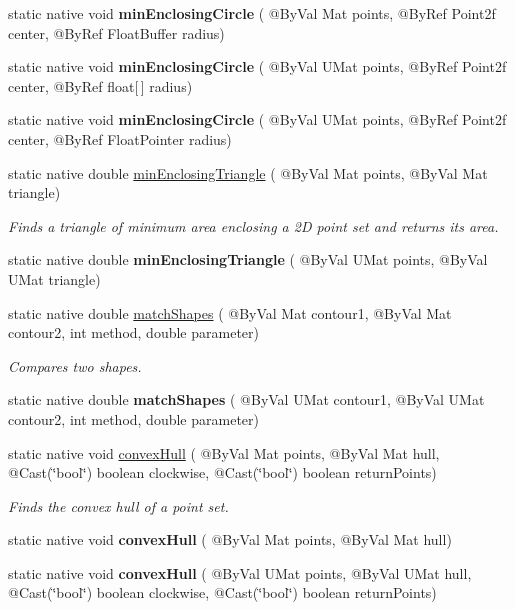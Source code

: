 \begin{DoxyCompactItemize}
static native void {\bfseries min\+Enclosing\+Circle} ( @By\+Val Mat points, @By\+Ref Point2f center, @By\+Ref Float\+Buffer radius)
\item 
static native void {\bfseries min\+Enclosing\+Circle} ( @By\+Val U\+Mat points, @By\+Ref Point2f center, @By\+Ref float\mbox{[}$\,$\mbox{]} radius)
\item 
static native void {\bfseries min\+Enclosing\+Circle} ( @By\+Val U\+Mat points, @By\+Ref Point2f center, @By\+Ref Float\+Pointer radius)
\item 
static native double \hyperlink{group__imgproc__shape_ga789d0feac6b1ff1a2d13cfc58fa3e898}{min\+Enclosing\+Triangle} ( @By\+Val Mat points, @By\+Val Mat triangle)
\begin{DoxyCompactList}\small\item\em Finds a triangle of minimum area enclosing a 2D point set and returns its area. \end{DoxyCompactList}\item 
static native double {\bfseries min\+Enclosing\+Triangle} ( @By\+Val U\+Mat points, @By\+Val U\+Mat triangle)
\item 
static native double \hyperlink{group__imgproc__shape_gad14ba9809a9703bef3dbdcd1a487d2fb}{match\+Shapes} ( @By\+Val Mat contour1, @By\+Val Mat contour2, int method, double parameter)
\begin{DoxyCompactList}\small\item\em Compares two shapes. \end{DoxyCompactList}\item 
static native double {\bfseries match\+Shapes} ( @By\+Val U\+Mat contour1, @By\+Val U\+Mat contour2, int method, double parameter)
\item 
static native void \hyperlink{group__imgproc__shape_gad55038a508ccdb2a51346a9321039983}{convex\+Hull} ( @By\+Val Mat points, @By\+Val Mat hull, @Cast(\char`\"{}bool\char`\"{}) boolean clockwise, @Cast(\char`\"{}bool\char`\"{}) boolean return\+Points)
\begin{DoxyCompactList}\small\item\em Finds the convex hull of a point set. \end{DoxyCompactList}\item 
static native void {\bfseries convex\+Hull} ( @By\+Val Mat points, @By\+Val Mat hull)
\item 
static native void {\bfseries convex\+Hull} ( @By\+Val U\+Mat points, @By\+Val U\+Mat hull, @Cast(\char`\"{}bool\char`\"{}) boolean clockwise, @Cast(\char`\"{}bool\char`\"{}) boolean return\+Points)

\end{DoxyCompactItemize}
